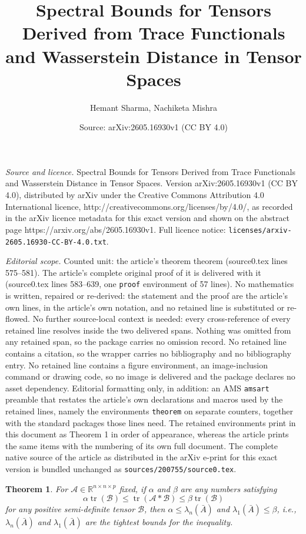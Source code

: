 \documentclass[10pt,a4paper]{amsart}
\title{Spectral Bounds for Tensors Derived from Trace Functionals and Wasserstein Distance in Tensor Spaces}
\author{Hemant Sharma, Nachiketa Mishra}
\date{Source: arXiv:2605.16930v1 (CC BY 4.0)}
\newtheorem{theorem}{Theorem}
\begin{document}
\maketitle

\noindent\emph{Source and licence.} Spectral Bounds for Tensors Derived from Trace Functionals and Wasserstein Distance in Tensor Spaces. Version arXiv:2605.16930v1 (CC BY 4.0), distributed by arXiv under the Creative Commons Attribution 4.0 International licence, http://creativecommons.org/licenses/by/4.0/, as recorded in the arXiv licence metadata for this exact version and shown on the abstract page https://arxiv.org/abs/2605.16930v1. Full licence notice: \texttt{licenses/arxiv-2605.16930-CC-BY-4.0.txt}.\par\smallskip

\noindent\textit{Editorial scope.} Counted unit: the article's theorem theorem (source0.tex lines 575--581). The article's complete original proof of it is delivered with it (source0.tex lines 583--639, one \texttt{proof} environment of 57 lines). No mathematics is written, repaired or re-derived: the statement and the proof are the article's own lines, in the article's own notation, and no retained line is substituted or re-flowed.  No further source-local context is needed: every cross-reference of every retained line resolves inside the two delivered spans.  Nothing was omitted from any retained span, so the package carries no omission record.  No retained line contains a citation, so the wrapper carries no bibliography and no bibliography entry.  No retained line contains a figure environment, an image-inclusion command or drawing code, so no image is delivered and the package declares no asset dependency.  Editorial formatting only, in addition: an AMS \texttt{amsart} preamble that restates the article's own declarations and macros used by the retained lines, namely the environments \texttt{theorem} on separate counters, together with the standard packages those lines need.  The retained environments print in this document as Theorem 1 in order of appearance, whereas the article prints the same items with the numbering of its own full document.  The complete native source of the article as distributed in the arXiv e-print for this exact version is bundled unchanged as \texttt{sources/200755/source0.tex}.
\begin{theorem}
    For $\mathcal{A} \in \mathbb{R}^{n \times n \times p}$ fixed, if $\alpha$ and $\beta$ are any numbers satisfying
    \[
    \alpha \operatorname{tr}(\mathcal{B}) \leq \operatorname{tr}(\mathcal{A} * \mathcal{B}) \leq \beta \operatorname{tr}(\mathcal{B})
    \]
    for any positive semi-definite tensor $\mathcal{B}$, then $\alpha \leq \lambda_n(\bar{A})$ and $\lambda_1(\bar{A}) \leq \beta$, i.e., $\lambda_n(\bar{A})$ and $\lambda_1(\bar{A})$ are the tightest bounds for the inequality.
\end{theorem}
\end{document}
